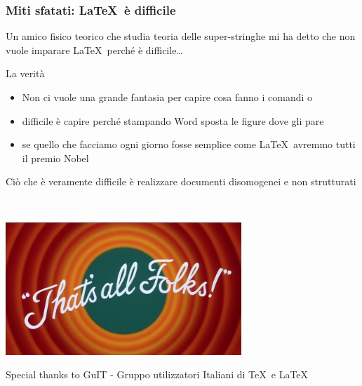 \documentclass[10pt,svgnames,%
ucs,%
pdftex]{mybeamer}
\begin{document}
\begin{frame}
	\frametitle{Miti sfatati: \LaTeX\ \`e difficile} 
	Un amico fisico teorico che studia teoria delle super-stringhe mi ha detto che non vuole imparare \LaTeX\ perch\'e \`e difficile\dots
	\medskip
	\begin{block}{La verit\`a}
		\begin{itemize}
			\item Non ci vuole una grande fantasia per capire cosa fanno i comandi  o 
			\item difficile \`e capire perch\'e stampando Word sposta le figure dove gli pare
			\item se quello che facciamo ogni giorno fosse semplice come \LaTeX\ avremmo tutti il premio Nobel
		\end{itemize}
	\end{block}
	\smallskip
	\begin{block}{}
		Ci\`o che \`e veramente difficile \`e realizzare documenti disomogenei e non strutturati
	\end{block}
\end{frame}

\begin{frame}{\,}
	\begin{center}
		\includegraphics[height=5cm]{img/thats-all-folks.jpg}
	\end{center}
	\begin{block}{}
		Special thanks to GuIT - Gruppo utilizzatori Italiani di \TeX\ e \LaTeX\
	\end{block}
\end{frame}
\end{document}
